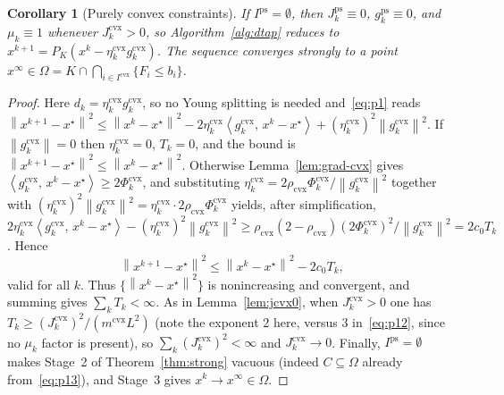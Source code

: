 \documentclass[]{interact}
\theoremstyle{plain}
\newtheorem{corollary}[theorem]{Corollary}
\theoremstyle{definition}
\theoremstyle{remark}
\newcommand{\norm}[1]{\left\lVert #1 \right\rVert}
\newcommand{\inner}[2]{\left\langle #1,\, #2 \right\rangle}
\newcommand{\cvx}{\mathrm{cvx}}
\newcommand{\ps}{\mathrm{ps}}
\begin{document}
\begin{corollary}[Purely convex constraints]\label{cor:cvx}
If $I^{\ps}=\emptyset$, then $J^{\ps}_k\equiv0$, $g^{\ps}_k\equiv0$, and $\mu_k\equiv1$
whenever $J^{\cvx}_k>0$, so Algorithm~\ref{alg:dtap} reduces to
$x^{k+1}=P_K(x^k-\eta^{\cvx}_k g^{\cvx}_k)$. The sequence converges strongly to a point
$x^\infty\in\Omega=K\cap\bigcap_{i\in I^{\cvx}}\{F_i\le b_i\}$.
\end{corollary}
\begin{proof}
Here $d_k=\eta^{\cvx}_k g^{\cvx}_k$, so no Young splitting is needed and~\eqref{eq:p1} reads
$\norm{x^{k+1}-x^\star}^2\le\norm{x^k-x^\star}^2-2\eta^{\cvx}_k\inner{g^{\cvx}_k}{x^k-x^\star}+(\eta^{\cvx}_k)^2\norm{g^{\cvx}_k}^2$.
If $\norm{g^{\cvx}_k}=0$ then $\eta^{\cvx}_k=0$, $T_k=0$, and the bound is
$\norm{x^{k+1}-x^\star}^2\le\norm{x^k-x^\star}^2$. Otherwise Lemma~\ref{lem:grad-cvx} gives
$\inner{g^{\cvx}_k}{x^k-x^\star}\ge2\Phi^{\cvx}_k$, and substituting
$\eta^{\cvx}_k=2\rho_{\cvx}\Phi^{\cvx}_k/\norm{g^{\cvx}_k}^2$ together with
$(\eta^{\cvx}_k)^2\norm{g^{\cvx}_k}^2=\eta^{\cvx}_k\cdot2\rho_{\cvx}\Phi^{\cvx}_k$ yields, after
simplification,
$2\eta^{\cvx}_k\inner{g^{\cvx}_k}{x^k-x^\star}-(\eta^{\cvx}_k)^2\norm{g^{\cvx}_k}^2\ge\rho_{\cvx}(2-\rho_{\cvx})(2\Phi^{\cvx}_k)^2/\norm{g^{\cvx}_k}^2=2c_0T_k$.
Hence
\begin{equation}\label{eq:p15}
\norm{x^{k+1}-x^\star}^2\le\norm{x^k-x^\star}^2-2c_0T_k ,
\end{equation}
valid for all $k$. Thus $\{\norm{x^k-x^\star}^2\}$ is nonincreasing and convergent, and
summing gives $\sum_k T_k<\infty$. As in Lemma~\ref{lem:jcvx0}, when $J^{\cvx}_k>0$ one has
$T_k\ge(J^{\cvx}_k)^2/(m^{\cvx}L^2)$ (note the exponent $2$ here, versus $3$
in~\eqref{eq:p12}, since no $\mu_k$ factor is present), so $\sum_k(J^{\cvx}_k)^2<\infty$ and
$J^{\cvx}_k\to0$. Finally, $I^{\ps}=\emptyset$ makes Stage~2 of
Theorem~\ref{thm:strong} vacuous (indeed $C\subseteq\Omega$ already
from~\eqref{eq:p13}), and Stage~3 gives $x^k\to x^\infty\in\Omega$.
\end{proof}
\end{document}
